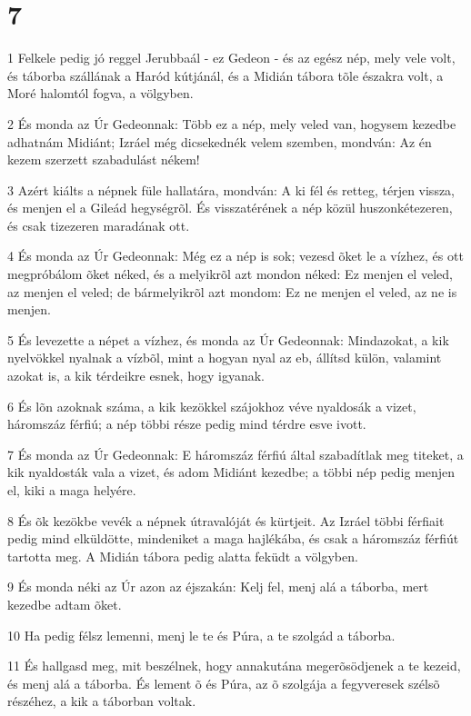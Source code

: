 \chapter{7}

\par 1 Felkele pedig jó reggel Jerubbaál - ez Gedeon - és az egész nép, mely vele volt, és táborba szállának a Haród kútjánál, és a Midián tábora tõle északra volt, a Moré halomtól fogva, a völgyben.
\par 2 És monda az Úr Gedeonnak: Több ez a nép, mely veled van, hogysem kezedbe adhatnám Midiánt; Izráel még dicsekednék velem szemben, mondván: Az én kezem szerzett szabadulást nékem!
\par 3 Azért kiálts a népnek füle hallatára, mondván: A ki fél és retteg, térjen vissza, és menjen el a Gileád hegységrõl. És visszatérének a nép közül huszonkétezeren, és csak tizezeren maradának ott.
\par 4 És monda az Úr Gedeonnak: Még ez a nép is sok; vezesd õket le a vízhez, és ott megpróbálom õket néked, és a melyikrõl azt mondon néked: Ez menjen el veled, az menjen el veled; de bármelyikrõl azt mondom: Ez ne menjen el veled, az ne is menjen.
\par 5 És levezette a népet a vízhez, és monda az Úr Gedeonnak: Mindazokat, a kik nyelvökkel nyalnak a vízbõl, mint a hogyan nyal az eb, állítsd külön, valamint azokat is, a kik térdeikre esnek, hogy igyanak.
\par 6 És lõn azoknak száma, a kik kezökkel szájokhoz véve nyaldosák a vizet, háromszáz férfiú; a nép többi része pedig mind térdre esve ivott.
\par 7 És monda az Úr Gedeonnak: E háromszáz férfiú által szabadítlak meg titeket, a kik nyaldosták vala a vizet, és adom Midiánt kezedbe; a többi nép pedig menjen el, kiki a maga helyére.
\par 8 És õk kezökbe vevék a népnek útravalóját és kürtjeit. Az Izráel többi férfiait pedig mind elküldötte, mindeniket a maga hajlékába, és csak a háromszáz férfiút tartotta meg. A Midián tábora pedig alatta feküdt a völgyben.
\par 9 És monda néki az Úr azon az éjszakán: Kelj fel, menj alá a táborba, mert kezedbe adtam õket.
\par 10 Ha pedig félsz lemenni, menj le te és Púra, a te szolgád a táborba.
\par 11 És hallgasd meg, mit beszélnek, hogy annakutána megerõsödjenek a te kezeid, és menj alá a táborba. És lement õ és Púra, az õ szolgája a fegyveresek szélsõ részéhez, a kik a táborban voltak.
